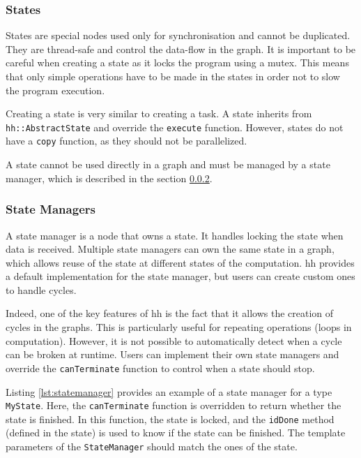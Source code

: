 \subsubsection{States}

States are special nodes used only for synchronisation and cannot be duplicated.
They are thread-safe and control the data-flow in the graph. It is important to
be careful when creating a state as it locks the program using a mutex. This
means that only simple operations have to be made in the states in order not to
slow the program execution.

Creating a state is very similar to creating a task. A state inherits from
\texttt{hh::AbstractState} and override the \texttt{execute} function. However,
states do not have a \texttt{copy} function, as they should not be parallelized.

A state cannot be used directly in a graph and must be managed by a state
manager, which is described in the section \ref{sec:statemanager}.

\subsubsection{State Managers}
\label{sec:statemanager}

A state manager is a node that owns a state. It handles locking the state when
data is received. Multiple state managers can own the same state in a graph,
which allows reuse of the state at different states of the computation. \gls{hh}
provides a default implementation for the state manager, but users can create
custom ones to handle cycles.

Indeed, one of the key features of \gls{hh} is the fact that it allows the
creation of cycles in the graphs. This is particularly useful for repeating
operations (loops in computation). However, it is not possible to automatically
detect when a cycle can be broken at runtime. Users can implement their own
state managers and override the \texttt{canTerminate} function to control when a
state should stop.

Listing \ref{lst:statemanager} provides an example of a state manager for a type
\texttt{MyState}. Here, the \texttt{canTerminate} function is overridden to
return whether the state is finished. In this function, the state is locked, and
the \texttt{idDone} method (defined in the state) is used to know if the state
can be finished. The template parameters of the \texttt{StateManager} should
match the ones of the state.


